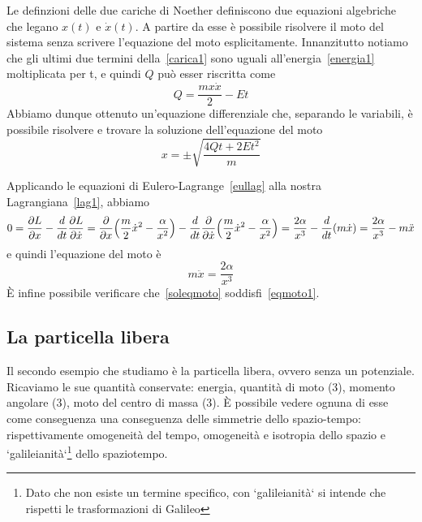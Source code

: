 \begin{example}
        \hfill

        Le definzioni delle due cariche di Noether definiscono due equazioni algebriche che legano $x(t)$ e $\dot x(t)$. A partire da esse è possibile risolvere il moto del sistema senza scrivere l'equazione del moto esplicitamente. Innanzitutto notiamo che gli ultimi due termini della~\eqref{carica1} sono uguali all'energia~\eqref{energia1} moltiplicata per t, e quindi $Q$ può esser riscritta come
    \begin{equation*}
        Q = \frac{m x \dot x}{2} - Et
    \end{equation*}
        Abbiamo dunque ottenuto un'equazione differenziale che, separando le variabili, è possibile risolvere e trovare la soluzione dell'equazione del moto
    \begin{equation} \label{soleqmoto}
        x = \pm \sqrt{\frac{4Qt + 2Et^2}{m}}
    \end{equation}
        
        Applicando le equazioni di Eulero-Lagrange~\eqref{eullag} alla nostra Lagrangiana~\eqref{lag1}, abbiamo
    \begin{equation*}
        0 = \frac{\partial L}{\partial x}  - \frac{d}{dt} \frac{\partial L}{\partial\dot x} = \frac{\partial}{\partial x} \Big(\frac{m}{2} \dot x^2 - \frac{\alpha}{x^2} \Big) - \frac{d}{dt} \frac{\partial}{\partial\dot x} \Big(\frac{m}{2} \dot x^2 - \frac{\alpha}{x^2} \Big) = \frac{2 \alpha}{x^3} - \frac{d}{dt} (m \dot x) = \frac{2 \alpha}{x^3} - m \ddot x 
    \end{equation*}
        e quindi l'equazione del moto è
    \begin{equation}\label{eqmoto1}
        m \ddot x = \frac{2 \alpha}{x^3}
    \end{equation}
        È infine possibile verificare che~\eqref{soleqmoto} soddisfi~\eqref{eqmoto1}.
    \end{example}

\subsection{La particella libera}
    Il secondo esempio che studiamo è la particella libera, ovvero senza un potenziale. Ricaviamo le sue quantità conservate: energia, quantità di moto (3), momento angolare (3), moto del centro di massa (3). È possibile vedere ognuna di esse come conseguenza una conseguenza delle simmetrie dello spazio-tempo: rispettivamente omogeneità del tempo, omogeneità e isotropia dello spazio e `galileianità`\footnote{Dato che non esiste un termine specifico, con `galileianità` si intende che rispetti le trasformazioni di Galileo} dello spaziotempo.

